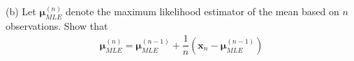 \documentclass[11pt,letterpaper]{article}
\begin{document}
\begin{enumerate}
{{(b) Let $\boldsymbol \mu_{MLE}^{(n)}$ denote the maximum likelihood estimator of the mean based on $n$ observations. Show that
\begin{align}
\boldsymbol \mu_{MLE}^{(n)} = \boldsymbol \mu_{MLE}^{(n-1)} + \dfrac{1}{n}(\mathbf{x}_n - \boldsymbol \mu_{MLE}^{(n-1)})
\end{align}
}}






\end{enumerate}
\end{document}
